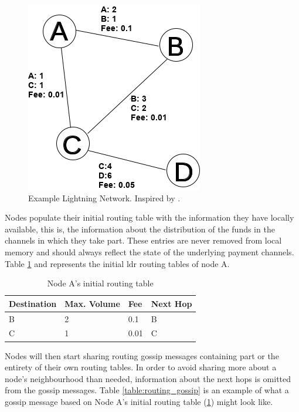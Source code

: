 \begin{figure}[H]
\begin{center}
  \includegraphics[width=0.6\linewidth]{images/networkabcd_cap.png}
  \caption{Example Lightning Network. Inspired by \cite{distance_vector}.}
  \label{fig:networkabcd}
  \end{center}
\end{figure}

Nodes populate their initial routing table with the information they have locally available, this is, the information about the distribution of the funds in the channels in which they take part. These entries are never removed from local memory and should always reflect the state of the underlying payment channels. Table \ref{table:routing_table_initial_a} and represents the initial \acrshort{ldr} routing tables of node A.

\begin{table}[H]
\begin{tabular}{|l|l|l|l|}
\hline
\rowcolor[HTML]{C0C0C0} 
Destination & Max. Volume   & Fee   & Next Hop \\ \hline
B           & 2             & 0.1   & B       \\ \hline
C           & 1             & 0.01  & C       \\ \hline
\end{tabular}
\caption{Node A's initial routing table}
\label{table:routing_table_initial_a}
\end{table}

Nodes will then start sharing routing gossip messages containing part or the entirety of their own routing tables. In order to avoid sharing more about a node's neighbourhood than needed, information about the next hops is omitted from the gossip messages. Table \ref{table:routing_gossip} is an example of what a gossip message based on Node A's initial routing table (\ref{table:routing_table_initial_a}) might look like.

